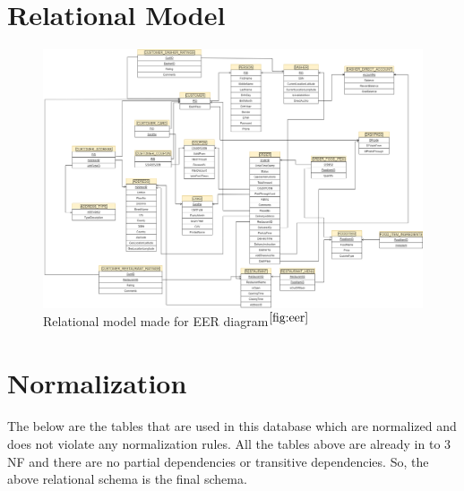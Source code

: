 \documentclass[12pt,letterpaper]{article}
\begin{document}
\section{Relational Model}
\begin{figure}[H]
 \begin{center}
     \includegraphics[scale=0.25]{figures/rel-model.png}
     \caption{Relational model made for EER diagram$^{\ref{fig:eer}}$}
     \label{fig:rel-model}
 \end{center}
\end{figure}

\section{Normalization}
The below are the tables that are used in this database which are normalized and does not violate any normalization rules. All the tables above are already in to 3 NF and there are no partial dependencies or transitive dependencies. So, the above relational schema is the final schema.
\end{document}
